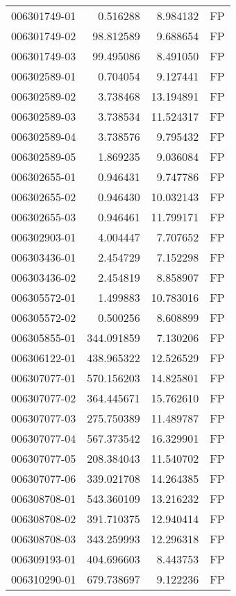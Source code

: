 \begin{tabular}{lrrl}
006301749-01 &    0.516288 &     8.984132 &   FP \\
006301749-02 &   98.812589 &     9.688654 &   FP \\
006301749-03 &   99.495086 &     8.491050 &   FP \\
006302589-01 &    0.704054 &     9.127441 &   FP \\
006302589-02 &    3.738468 &    13.194891 &   FP \\
006302589-03 &    3.738534 &    11.524317 &   FP \\
006302589-04 &    3.738576 &     9.795432 &   FP \\
006302589-05 &    1.869235 &     9.036084 &   FP \\
006302655-01 &    0.946431 &     9.747786 &   FP \\
006302655-02 &    0.946430 &    10.032143 &   FP \\
006302655-03 &    0.946461 &    11.799171 &   FP \\
006302903-01 &    4.004447 &     7.707652 &   FP \\
006303436-01 &    2.454729 &     7.152298 &   FP \\
006303436-02 &    2.454819 &     8.858907 &   FP \\
006305572-01 &    1.499883 &    10.783016 &   FP \\
006305572-02 &    0.500256 &     8.608899 &   FP \\
006305855-01 &  344.091859 &     7.130206 &   FP \\
006306122-01 &  438.965322 &    12.526529 &   FP \\
006307077-01 &  570.156203 &    14.825801 &   FP \\
006307077-02 &  364.445671 &    15.762610 &   FP \\
006307077-03 &  275.750389 &    11.489787 &   FP \\
006307077-04 &  567.373542 &    16.329901 &   FP \\
006307077-05 &  208.384043 &    11.540702 &   FP \\
006307077-06 &  339.021708 &    14.264385 &   FP \\
006308708-01 &  543.360109 &    13.216232 &   FP \\
006308708-02 &  391.710375 &    12.940414 &   FP \\
006308708-03 &  343.259993 &    12.296318 &   FP \\
006309193-01 &  404.696603 &     8.443753 &   FP \\
006310290-01 &  679.738697 &     9.122236 &   FP \\

\end{tabular}
